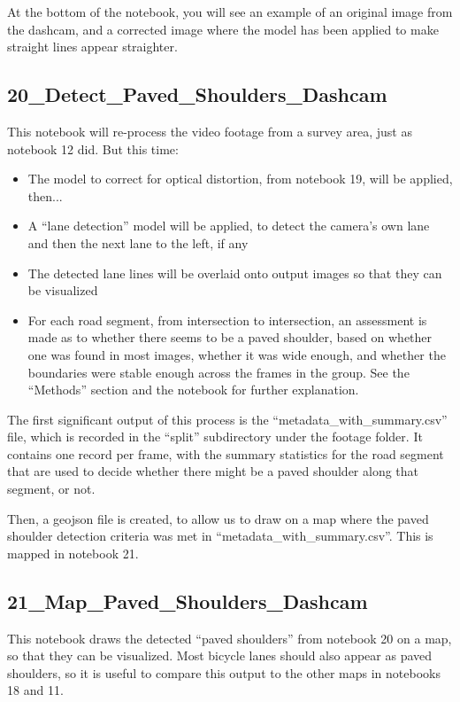 \documentclass[11pt,twoside]{report}
\begin{document}
At the bottom of the notebook, you will see an example of an original image from the dashcam, and a corrected image where the model has been applied to make straight lines appear straighter.


\subsection{20\_Detect\_Paved\_Shoulders\_Dashcam}
\label{a20}

This notebook will re-process the video footage from a survey area, just as notebook 12 did.  But this time:

\begin{itemize}
\item{The model to correct for optical distortion, from notebook 19, will be applied, then...}
\item{A ``lane detection'' model will be applied, to detect the camera's own lane and then the next lane to the left, if any}
\item{The detected lane lines will be overlaid onto output images so that they can be visualized}
\item{For each road segment, from intersection to intersection, an assessment is made as to whether there seems to be a paved shoulder, based on whether one was found in most images, whether it was wide enough, and whether the boundaries were stable enough across the frames in the group.  See the ``Methods'' section and the notebook for further explanation.}	
\end{itemize}

The first significant output of this process is the ``metadata\_with\_summary.csv'' file, which is recorded in the ``split'' subdirectory under the footage folder.  It contains one record per frame, with the summary statistics for the road segment that are used to decide whether there might be a paved shoulder along that segment, or not.

Then, a geojson file is created, to allow us to draw on a map where the paved shoulder detection criteria was met in ``metadata\_with\_summary.csv''.  This is mapped in notebook 21.


\subsection{21\_Map\_Paved\_Shoulders\_Dashcam}
\label{a21}

This notebook draws the detected ``paved shoulders'' from notebook 20 on a map, so that they can be visualized.  Most bicycle lanes should also appear as paved shoulders, so it is useful to compare this output to the other maps in notebooks 18 and 11.
\end{document}
